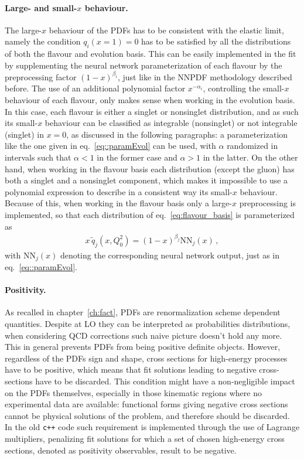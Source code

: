 \paragraph{Large- and small-$x$ behaviour.} 
The large-$x$ behaviour of the PDFs has to be consistent with the elastic limit, namely the condition
$q_i\left(x=1\right)=0$ has to be satisfied by all the distributions of both the flavour and evolution basis.
This can be easily implemented in the fit by supplementing the neural network parameterization of 
each flavour by the preprocessing factor $\left(1-x\right)^{\beta_i}$, just like in the NNPDF methodology
described before.
The use of an additional polynomial factor $x^{-\alpha_i}$, controlling the small-$x$ behaviour of each flavour,
only makes sense when working in the evolution basis. In this case, each flavour is either a singlet or nonsinglet
distribution, and as such its small-$x$ behaviour can be classified as integrable (nonsinglet) or not integrable (singlet)
in $x=0$, as discussed in the following paragraphs: a parameterization like the one given in eq.~\eqref{eq::paramEvol} can be used, with $\alpha$
randomized in intervals such that $\alpha<1$ in the former case and $\alpha>1$ in the latter.
%
On the other hand, when working in the flavour basis each distribution (except the gluon) has both a singlet 
and a nonsinglet component, which makes it impossible to use a polynomial expression 
to describe in a consistent way its small-$x$ behaviour. Because of this, when working in the flavour basis
only a large-$x$ preprocessing is implemented, so that each distribution of eq.~\eqref{eq:flavour_basis} is
parameterized as
\begin{align}
    x\,\tilde{q}_j\left(x, Q_0^2\right) = \left(1-x\right)^{\beta_{j}}\text{NN}_{j}\left(x\right)\,,
\end{align}
with $\text{NN}_{j}\left(x\right)$ denoting the corresponding neural network output, just as in eq.~\eqref{eq::paramEvol}.



\paragraph{Positivity.}
As recalled in chapter~\ref{ch:fact}, PDFs are renormalization scheme dependent quantities.
Despite at LO they can be interpreted as probabilities distributions, when considering QCD corrections
such naive picture doesn't hold any more. This in general prevents PDFs from being positive definite objects.
However, regardless of the PDFs sign and shape, cross sections for high-energy processes have to be positive,
which means that fit solutions leading to negative cross-sections have to be discarded.
This condition might have a non-negligible impact on the PDFs themselves, 
especially in those kinematic regions where no experimental
data are available: functional forms giving negative cross sections cannot be 
physical solutions of the problem, and therefore should be discarded.  
In the old {\tt c++} code such requirement is implemented through the use of Lagrange multipliers, 
penalizing fit solutions for which a set of chosen high-energy cross sections,
denoted as positivity observables, result to be negative.

